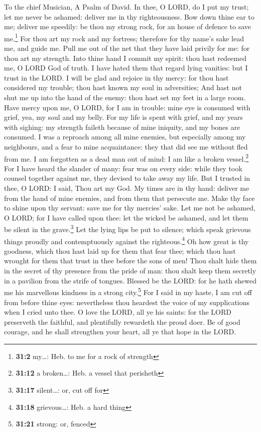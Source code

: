 To the chief Musician, A Psalm of David.  In thee, O LORD,
do I put my trust; let me never be ashamed: deliver me in thy
righteousness.  Bow down thine ear to me; deliver me
speedily: be thou my strong rock, for an house of defence to save
me.\footnote{\textbf{31:2} my\ldots: Heb. to me for a rock of strength}
 For thou art my rock and my fortress; therefore for thy
name's sake lead me, and guide me.  Pull me out of the net
that they have laid privily for me: for thou art my strength.
 Into thine hand I commit my spirit: thou hast redeemed
me, O LORD God of truth.  I have hated them that regard
lying vanities: but I trust in the LORD.  I will be glad
and rejoice in thy mercy: for thou hast considered my trouble; thou hast
known my soul in adversities;  And hast not shut me up
into the hand of the enemy: thou hast set my feet in a large room.
 Have mercy upon me, O LORD, for I am in trouble: mine eye
is consumed with grief, yea, my soul and my belly.  For
my life is spent with grief, and my years with sighing: my strength
faileth because of mine iniquity, and my bones are consumed.
 I was a reproach among all mine enemies, but especially
among my neighbours, and a fear to mine acquaintance: they that did see
me without fled from me.  I am forgotten as a dead man
out of mind: I am like a broken vessel.\footnote{\textbf{31:12} a
  broken\ldots: Heb. a vessel that perisheth}  For I have
heard the slander of many: fear was on every side: while they took
counsel together against me, they devised to take away my life.
 But I trusted in thee, O LORD: I said, Thou art my God.
 My times are in thy hand: deliver me from the hand of
mine enemies, and from them that persecute me.  Make thy
face to shine upon thy servant: save me for thy mercies' sake.
 Let me not be ashamed, O LORD; for I have called upon
thee: let the wicked be ashamed, and let them be silent in the
grave.\footnote{\textbf{31:17} silent\ldots: or, cut off for}
 Let the lying lips be put to silence; which speak
grievous things proudly and contemptuously against the
righteous.\footnote{\textbf{31:18} grievous\ldots: Heb. a hard thing}
 Oh how great is thy goodness, which thou hast laid up
for them that fear thee; which thou hast wrought for them that trust in
thee before the sons of men!  Thou shalt hide them in the
secret of thy presence from the pride of man: thou shalt keep them
secretly in a pavilion from the strife of tongues. 
Blessed be the LORD: for he hath shewed me his marvellous kindness in a
strong city.\footnote{\textbf{31:21} strong: or, fenced} 
For I said in my haste, I am cut off from before thine eyes:
nevertheless thou heardest the voice of my supplications when I cried
unto thee.  O love the LORD, all ye his saints: for the
LORD preserveth the faithful, and plentifully rewardeth the proud doer.
 Be of good courage, and he shall strengthen your heart,
all ye that hope in the LORD.

